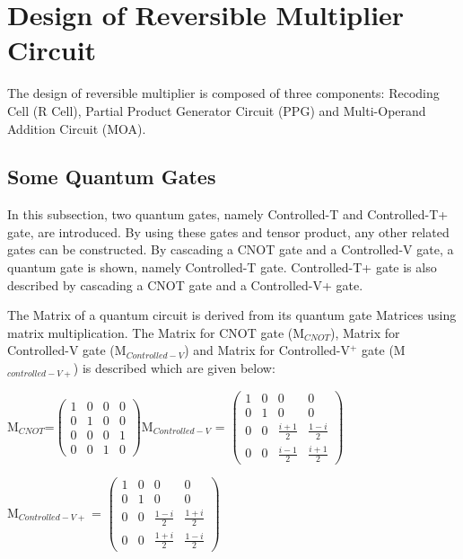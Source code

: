\section{Design of Reversible Multiplier Circuit}

The design of reversible multiplier is composed of three components: Recoding Cell (R Cell), Partial Product Generator Circuit (PPG) and Multi-Operand Addition Circuit (MOA).  %
\subsection{Some Quantum Gates}
In this subsection, two quantum gates, namely Controlled-T and Controlled-T+ gate, are introduced. By using these gates and tensor product, any other related gates can be constructed. By cascading a CNOT gate and a Controlled-V gate, a quantum gate is shown, namely Controlled-T gate. Controlled-T+ gate is also described by cascading a CNOT gate and a Controlled-V+ gate.

The Matrix of a quantum circuit is derived from its quantum gate Matrices using matrix multiplication. The Matrix for CNOT gate (M${}_{CNOT}$), Matrix for Controlled-V gate (M${}_{Controlled-V}$) and Matrix for Controlled-V${}^{+}$ gate (M${}_{controlled-V+}$) is described which are given below:



\begin{center}
	M${}_{CNOT}$=$\left( \begin{array}{cccc}
	1 & 0 & 0 & 0 \\ 
	0 & 1 & 0 & 0 \\ 
	0 & 0 & 0 & 1 \\ 
	0 & 0 & 1 & 0 \end{array}
	\right)$M${}_{Controlled-V}$ =  $\left( \begin{array}{cccc}
	1 & 0 & 0 & 0 \\ 
	0 & 1 & 0 & 0 \\ 
	0 & 0 & \frac{i+1}{2} & \frac{1-i}{2} \\ 
	0 & 0 & \frac{i-1}{2} & \frac{i+1}{2} \end{array}
	\right)$
	
	M${}_{Controlled-V+}$ =   $\left( \begin{array}{cccc}
	1 & 0 & 0 & 0 \\ 
	0 & 1 & 0 & 0 \\ 
	0 & 0 & \frac{1-i}{2} & \frac{1+i}{2} \\ 
	0 & 0 & \frac{1+i}{2} & \frac{1-i}{2} \end{array}
	\right)$
\end{center}

